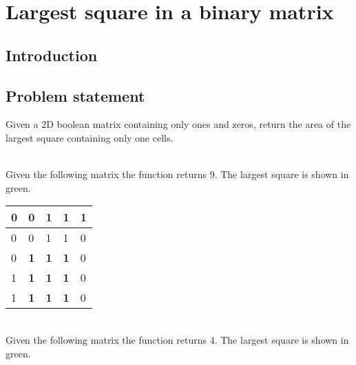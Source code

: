 %

\chapter{Largest square in a binary matrix}
\label{ch:square_in_matrix}
\section*{Introduction}

\section{Problem statement}
\begin{exercise}
Given a 2D boolean matrix containing only ones and zeros, return the area of the largest square containing only one cells.


	\begin{example}
		\hfill \\
		Given the following matrix the function returns $9$. The largest square is shown in green.

		\begin{tabular}{|l|l|l|l|l|}
		\hline
		0 & 0                                  & 1                                  & 1                                  & 1 \\ \hline
		0 & 0                                  & 1                                  & 1                                  & 0 \\ \hline
		0 & \cellcolor[HTML]{32CB00}\textbf{1} & \cellcolor[HTML]{32CB00}\textbf{1} & \cellcolor[HTML]{32CB00}\textbf{1} & 0 \\ \hline
		1 & \cellcolor[HTML]{32CB00}\textbf{1} & \cellcolor[HTML]{32CB00}\textbf{1} & \cellcolor[HTML]{32CB00}\textbf{1} & 0 \\ \hline
		1 & \cellcolor[HTML]{32CB00}\textbf{1} & \cellcolor[HTML]{32CB00}\textbf{1} & \cellcolor[HTML]{32CB00}\textbf{1} & 0 \\ \hline
		\end{tabular}
		
	\end{example}

	\begin{example}
		\hfill \\
		Given the following matrix the function returns $4$. The largest square is shown in green.


\end{example}
\end{exercise}
